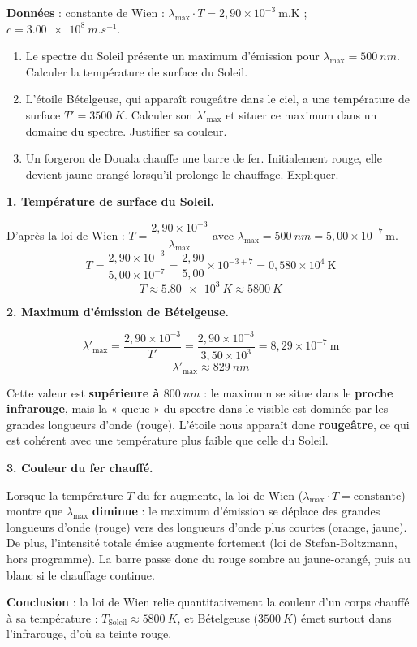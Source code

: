\documentclass[11pt]{article}
\begin{document}
\begin{exoresolu}
\textbf{Données} : constante de Wien : $\lambda_{\max} \cdot T = 2,90 \times 10^{-3}\ \text{m.K}$ ; $c = \SI{3,00e8}{m.s^{-1}}$.
\begin{enumerate}
\item Le spectre du Soleil présente un maximum d'émission pour $\lambda_{\max} = \SI{500}{nm}$. Calculer la température de surface du Soleil.
\item L'étoile Bételgeuse, qui apparaît rougeâtre dans le ciel, a une température de surface $T' = \SI{3500}{K}$. Calculer son $\lambda'_{\max}$ et situer ce maximum dans un domaine du spectre. Justifier sa couleur.
\item Un forgeron de Douala chauffe une barre de fer. Initialement rouge, elle devient jaune-orangé lorsqu'il prolonge le chauffage. Expliquer.
\end{enumerate}
\tcblower
\textbf{1. Température de surface du Soleil.}

D'après la loi de Wien : $T = \dfrac{2,90 \times 10^{-3}}{\lambda_{\max}}$ avec $\lambda_{\max} = \SI{500}{nm} = 5,00 \times 10^{-7}\ \text{m}$.
\[ T = \frac{2,90 \times 10^{-3}}{5,00 \times 10^{-7}} = \frac{2,90}{5,00} \times 10^{-3+7} = 0,580 \times 10^{4}\ \text{K} \]
\[ \boxed{T \approx \SI{5,80e3}{K} \approx \SI{5800}{K}} \]

\textbf{2. Maximum d'émission de Bételgeuse.}

\[ \lambda'_{\max} = \frac{2,90 \times 10^{-3}}{T'} = \frac{2,90 \times 10^{-3}}{3,50 \times 10^{3}} = 8,29 \times 10^{-7}\ \text{m} \]
\[ \boxed{\lambda'_{\max} \approx \SI{829}{nm}} \]

Cette valeur est \textbf{supérieure à $\SI{800}{nm}$} : le maximum se situe dans le \textbf{proche infrarouge}, mais la « queue » du spectre dans le visible est dominée par les grandes longueurs d'onde (rouge). L'étoile nous apparaît donc \textbf{rougeâtre}, ce qui est cohérent avec une température plus faible que celle du Soleil.

\textbf{3. Couleur du fer chauffé.}

Lorsque la température $T$ du fer augmente, la loi de Wien ($\lambda_{\max} \cdot T = \text{constante}$) montre que $\lambda_{\max}$ \textbf{diminue} : le maximum d'émission se déplace des grandes longueurs d'onde (rouge) vers des longueurs d'onde plus courtes (orange, jaune). De plus, l'intensité totale émise augmente fortement (loi de Stefan-Boltzmann, hors programme). La barre passe donc du rouge sombre au jaune-orangé, puis au blanc si le chauffage continue.

\textbf{Conclusion} : la loi de Wien relie quantitativement la couleur d'un corps chauffé à sa température : $T_{\text{Soleil}} \approx \SI{5800}{K}$, et Bételgeuse ($\SI{3500}{K}$) émet surtout dans l'infrarouge, d'où sa teinte rouge.
\end{exoresolu}
\end{document}
